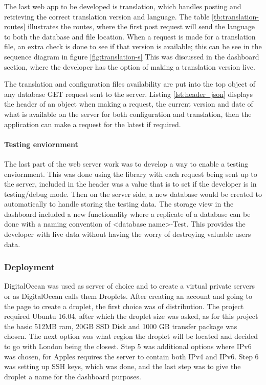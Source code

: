 The last web app to be developed is translation, which handles posting and retrieving the correct translation version and language. The table \ref{tb:translation-routes} illustrates the routes, where the first post request will send the language to both the database and file location. When a request is made for a translation file, an extra check is done to see if that version is available; this can be see in the sequence diagram in figure \ref{fig:translation-s} This was discussed in the dashboard section, where the developer has the option of making a translation version live.

The translation and configuration files availability are put into the top object of any database GET request sent to the server. Listing \ref{lst:header_json} displays the header of an object when making a request, the current version and date of what is available on the server for both configuration and translation, then the application can make a request for the latest if required.



\paragraph{Testing enviornment}

The last part of the web server work was to develop a way to enable a testing enviornment. This was done using the library with each request being sent up to the server, included in the header was a value that is to set if the developer is in testing/debug mode. Then on the server side, a new database would be created to automatically to handle storing the testing data. The storage view in the dashboard included a new functionality where a replicate of a database can be done with a naming convention of <database name>-Test. This provides the developer with live data without having the worry of destroying valuable users data.

\subsubsection{Deployment}

DigitalOcean was used as server of choice and to create a virtual private servers or as DigitalOcean calls them Droplets. After creating an account and going to the page to create a droplet, the first choice was of distribution. The project required Ubuntu 16.04, after which the droplet size was asked, as for this project the basic 512MB ram, 20GB SSD Disk and 1000 GB transfer package was chosen. The next option was what region the droplet will be located and decided to go with London being the closest. Step 5 was additional options where IPv6 was chosen, for Apples requires the server to contain both IPv4 and IPv6. Step 6 was setting up SSH keys, which was done, and the last step was to give the droplet a name for the dashboard purposes.

